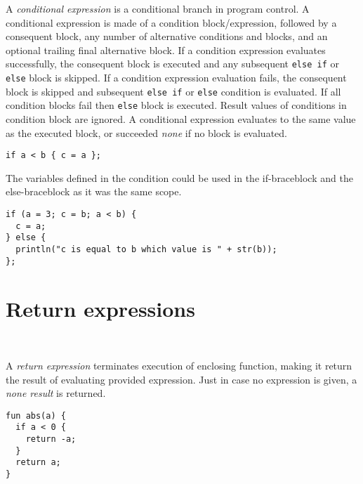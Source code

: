 A \emph{conditional expression} is a conditional branch in program control. A conditional expression is made of a condition block/expression, followed by a consequent block, any number of alternative conditions and blocks, and an optional trailing final alternative block. If a condition expression evaluates successfully, the consequent block is executed and any subsequent \lstinline{else if} or \lstinline{else} block is skipped. If a condition expression evaluation fails, the consequent block is skipped and subsequent \lstinline{else if} or \lstinline{else} condition is evaluated. If all condition blocks fail then \lstinline{else} block is executed. Result values of conditions in condition block are ignored. A conditional expression evaluates to the same value as the executed block, or succeeded \emph{none} if no block is evaluated.

\begin{example}
\begin{lstlisting}[language=intentio]
if a < b { c = a };
\end{lstlisting}
\end{example}

The variables defined in the condition could be used in the if-braceblock and the else-braceblock as it was the same scope.

\begin{example}[If expression]
\begin{lstlisting}[language=intentio]
if (a = 3; c = b; a < b) {
  c = a;
} else {
  println("c is equal to b which value is " + str(b));
};
\end{lstlisting}
\end{example}

\section{Return expressions}

\begin{bnf}
   \eq {} \ 
\end{bnf}

A \emph{return expression} terminates execution of enclosing function, making it return the result of evaluating provided expression. Just in case no expression is given, a \emph{none result} is returned.

\begin{example}
\begin{lstlisting}[language=intentio]
fun abs(a) {
  if a < 0 {
    return -a;
  }
  return a;
}
\end{lstlisting}
\end{example}
